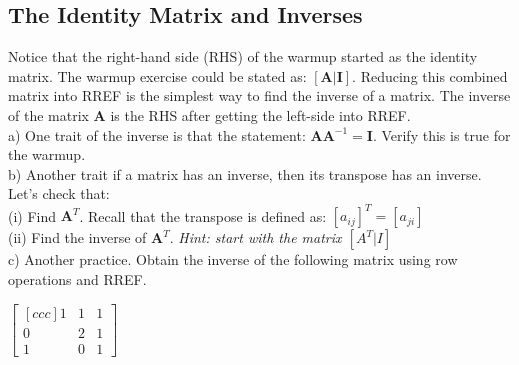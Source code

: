 \documentclass{article}
\begin{document}
\begin{flushleft}
\begin{center}
\section{The Identity Matrix and Inverses}
\end{center}
Notice that the right-hand side (RHS) of the warmup started as the identity matrix. The warmup exercise could be stated as: $[\textbf{A}|\textbf{I}]$. Reducing this combined matrix into RREF is the simplest way to find the inverse of a matrix. The inverse of the matrix \textbf{A} is the RHS after getting the left-side into RREF.\\
\vspace{0.1in}
a) One trait of the inverse is that the statement: $\textbf{A} \textbf{A}^{-1} = \textbf{I} $. Verify this is true for the warmup.\\
\vspace{1.5in}
b) Another trait if a matrix has an inverse, then its transpose has an inverse. Let's check that:\\
(i) Find $\textbf{A}^T$. Recall that the transpose is defined as: $[a_{ij}]^T = [a_{ji}]$\\
\vspace{1.5in}
(ii) Find the inverse of $\textbf{A}^T$. \textit{Hint: start with the matrix  $\left[ A^T | I \right] $ }\\
\vspace{2in}
c) Another practice. Obtain the inverse of the following matrix using row operations and RREF.\\
\begin{center}
$\begin{bmatrix}[ccc]
1 & 1 & 1 \\
0 & 2 & 1 \\
1 & 0 & 1 
\end{bmatrix}$

\newpage

\end{center}
\end{flushleft}
\end{document}
